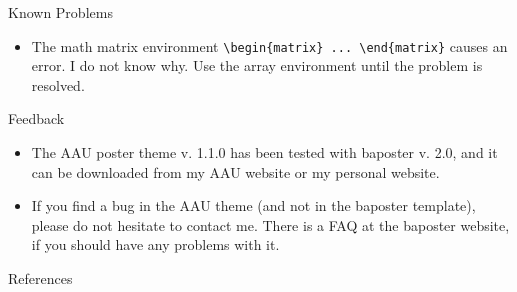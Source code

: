 \documentclass[a0paper,portrait]{baposter}
\begin{document}
\begin{poster}
\begin{posterbox}[name=problems,column=1,below=install]{Known Problems}
  \begin{itemize}
    \item The math matrix environment {\tt \textbackslash begin\{matrix\} ... \textbackslash end\{matrix\}} causes an error. I do not know why. Use the array environment until the problem is resolved.
  \end{itemize}
\end{posterbox}

\begin{posterbox}[name=feedback,column=1,below=problems]{Feedback}
  \begin{itemize}
    \item The AAU poster theme v. 1.1.0 has been tested with baposter v. 2.0, and it can be downloaded from my AAU website or my personal website.
    \item If you find a bug in the AAU theme (and not in the baposter template), please do not hesitate to contact me. There is a FAQ at the baposter website, if you should have any problems with it. \cite{hanhunsu2004}
  \end{itemize}
\end{posterbox}

\begin{posterbox}[name=refs,column=1,below=feedback,above=bottom]{References}





%  
%   

\end{posterbox}

\end{poster}
\end{document}
